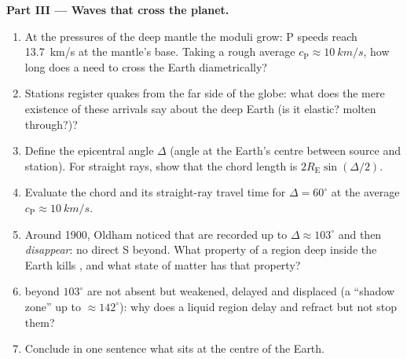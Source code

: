 \begin{problem}
\medskip\noindent\textbf{Part III --- Waves that cross the planet.}
\begin{enumerate}[resume]
  \item At the pressures of the deep mantle the moduli grow: P speeds
        reach \qty{13.7}{km/s} at the mantle's base. Taking a rough
        average $c_{\text{P}} \approx \qty{10}{km/s}$, how long does a
         need to cross the Earth diametrically?
  \item Stations register quakes from the far side of the globe:
        what does the mere existence of these arrivals say about the
        deep Earth (is it elastic? molten through?)?
  \item Define the epicentral angle $\Delta$ (angle at the Earth's
        centre between source and station). For straight rays, show
        that the chord length is $2R_{\text{E}}\sin(\Delta/2)$.
  \item Evaluate the chord and its straight-ray travel time for
        $\Delta = 60^\circ$ at the average $c_{\text{P}} \approx
        \qty{10}{km/s}$.
  \item Around 1900, Oldham noticed that  are recorded up to
        $\Delta \approx 103^\circ$ and then \emph{disappear}: no
        direct S beyond. What property of a region deep inside the
        Earth kills , and what state of matter has that
        property?
  \item {} beyond $103^\circ$ are not absent but weakened,
        delayed and displaced (a ``shadow zone'' up to
        $\approx 142^\circ$): why does a liquid region delay and
        refract  but not stop them?
  \item Conclude in one sentence what sits at the centre of the
        Earth.
\end{enumerate}


\end{problem}
